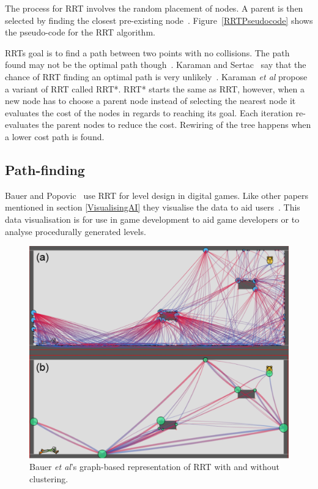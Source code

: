 \documentclass[journal]{IEEEtran}
\begin{document}
The process for RRT involves the random placement of nodes. A parent is then selected by finding the closest pre-existing node~\cite{Kuffner2000}. Figure~\ref{RRTPseudocode} shows the pseudo-code for the RRT algorithm. 


RRTs goal is to find a path between two points with no collisions. The path found may not be the optimal path though~\cite{Kuffner2000,Karaman2011}. Karaman and Sertac~\cite{karaman2010} say that the chance of RRT finding an optimal path is very unlikely~\cite{karaman2010,Tremblay2014}.  Karaman \textit{et al} propose a variant of RRT called RRT*. RRT* starts the same as RRT, however, when a new node has to choose a parent node instead of selecting the nearest node it evaluates the cost of the nodes in regards to reaching its goal. Each iteration re-evaluates the parent nodes to reduce the cost. Rewiring of the tree happens when a lower cost path is found.

\subsection{Path-finding} \label{Pathfinding}
Bauer and Popovic~\cite{bauer2012} use RRT for level design in digital games. Like other papers mentioned in section \ref{VisualisingAI} they visualise the data to aid users~\cite{bauer2012,Haworth2010}. This data visualisation is for use in game development to aid game developers or to analyse procedurally generated levels. 

\begin{figure}[h]
	\includegraphics[width=1.0\linewidth]{BauerRRT.png}
	\caption{ Bauer \textit{et al}'s\cite{bauer2012} graph-based representation of RRT with and without clustering.}
	\label{BauerRRT}
\end{figure} 
\end{document}
